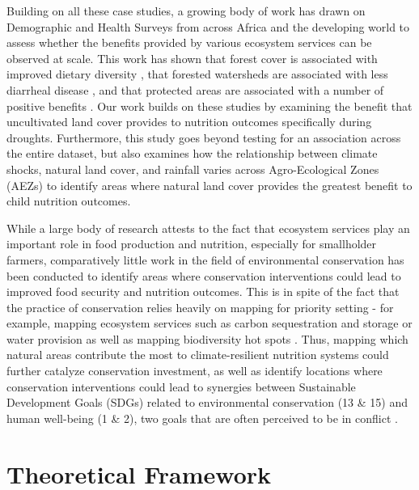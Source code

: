 \documentclass{article}
\begin{document}
Building on all these case studies, a growing body of work has drawn on Demographic and Health Surveys from across Africa and the developing world to assess whether the benefits provided by various ecosystem services can be observed at scale.  This work has shown that forest cover is associated with improved dietary diversity \cite{Ickowitz2014, Rasolofoson2018}, that forested watersheds are associated with less diarrheal disease \cite{Herrera2017}, and that protected areas are associated with a number of positive benefits \cite{naidoo2019evaluating}.  Our work builds on these studies by examining the benefit that uncultivated land cover provides to nutrition outcomes specifically during droughts.  Furthermore, this study goes beyond testing for an association across the entire dataset, but also examines how the relationship between climate shocks, natural land cover, and rainfall varies across Agro-Ecological Zones (AEZs) to identify areas where natural land cover provides the greatest benefit to child nutrition outcomes.

While a large body of research attests to the fact that ecosystem services play an important role in food production and nutrition, especially for smallholder farmers, comparatively little work in the field of environmental conservation has been conducted to identify areas where conservation interventions could lead to improved food security and nutrition outcomes.  This is in spite of the fact that the practice of conservation relies heavily on mapping for priority setting - for example, mapping ecosystem services such as carbon sequestration and storage \citep{Kim2016} or water provision \citep{immerzeel2020importance} as well as mapping biodiversity hot spots \citep{holland2012conservation}.  Thus, mapping which natural areas contribute the most to climate-resilient nutrition systems could further catalyze conservation investment, as well as identify locations where conservation interventions could lead to synergies between Sustainable Development Goals (SDGs) related to environmental conservation (13 \& 15) and human well-being (1 \& 2), two goals that are often perceived to be in conflict \citep{moore2016improving, mcshane2011hard}.

\section{Theoretical Framework}
\end{document}

